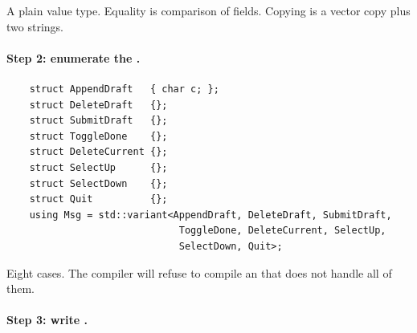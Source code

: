 A plain value type. Equality is comparison of fields. Copying is a
vector copy plus two strings.

\paragraph{Step 2: enumerate the .}

\begin{lstlisting}
    struct AppendDraft   { char c; };
    struct DeleteDraft   {};
    struct SubmitDraft   {};
    struct ToggleDone    {};
    struct DeleteCurrent {};
    struct SelectUp      {};
    struct SelectDown    {};
    struct Quit          {};
    using Msg = std::variant<AppendDraft, DeleteDraft, SubmitDraft,
                              ToggleDone, DeleteCurrent, SelectUp,
                              SelectDown, Quit>;
\end{lstlisting}

Eight cases. The compiler will refuse to compile an 
that does not handle all of them.

\paragraph{Step 3: write .}

